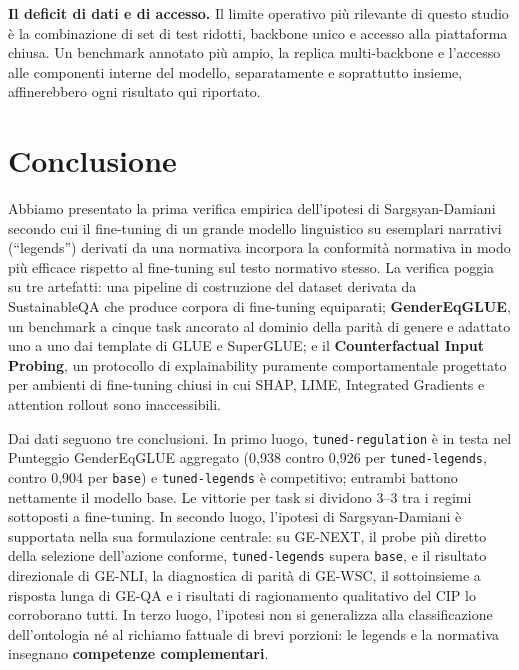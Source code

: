 \documentclass[pdflatex, sn-apa]{sn-jnl}%
\theoremstyle{thmstyleone}%
\theoremstyle{thmstyletwo}%
\theoremstyle{thmstylethree}%
\newcommand{\modelbase}{\texttt{base}}
\newcommand{\modellegends}{\texttt{tuned-legends}}
\newcommand{\modelreg}{\texttt{tuned-regulation}}
\begin{document}
\textbf{Il deficit di dati e di accesso.} Il limite operativo più rilevante di
questo studio è la combinazione di set di test ridotti, backbone unico e accesso
alla piattaforma chiusa. Un benchmark annotato più ampio, la replica multi-backbone
e l'accesso alle componenti interne del modello, separatamente e soprattutto
insieme, affinerebbero ogni risultato qui riportato.

\section{Conclusione}
\label{sec:conclusion}

Abbiamo presentato la prima verifica empirica dell'ipotesi di Sargsyan-Damiani
secondo cui il fine-tuning di un grande modello linguistico su esemplari narrativi
(``legends'') derivati da una normativa incorpora la conformità normativa in modo
più efficace rispetto al fine-tuning sul testo normativo stesso. La verifica poggia
su tre artefatti: una pipeline di costruzione del dataset derivata da SustainableQA
che produce corpora di fine-tuning equiparati; \textbf{GenderEqGLUE}, un benchmark
a cinque task ancorato al dominio della parità di genere e adattato uno a uno dai
template di GLUE e SuperGLUE; e il \textbf{Counterfactual Input Probing}, un
protocollo di explainability puramente comportamentale progettato per ambienti di
fine-tuning chiusi in cui SHAP, LIME, Integrated Gradients e attention rollout sono
inaccessibili.

Dai dati seguono tre conclusioni. In primo luogo, \modelreg{} è in testa nel
Punteggio GenderEqGLUE aggregato (0,938 contro 0,926 per \modellegends, contro
0,904 per \modelbase) e \modellegends{} è competitivo; entrambi battono nettamente
il modello base. Le vittorie per task si dividono 3--3 tra i regimi sottoposti a
fine-tuning. In secondo luogo, l'ipotesi di Sargsyan-Damiani è supportata nella sua
formulazione centrale: su GE-NEXT, il probe più diretto della selezione dell'azione
conforme, \modellegends{} supera \modelbase{}, e il risultato direzionale di
GE-NLI, la diagnostica di parità di GE-WSC, il sottoinsieme a risposta lunga di
GE-QA e i risultati di ragionamento qualitativo del CIP lo corroborano tutti. In
terzo luogo, l'ipotesi non si generalizza alla classificazione dell'ontologia né al
richiamo fattuale di brevi porzioni: le legends e la normativa insegnano
\textbf{competenze complementari}.
\end{document}
